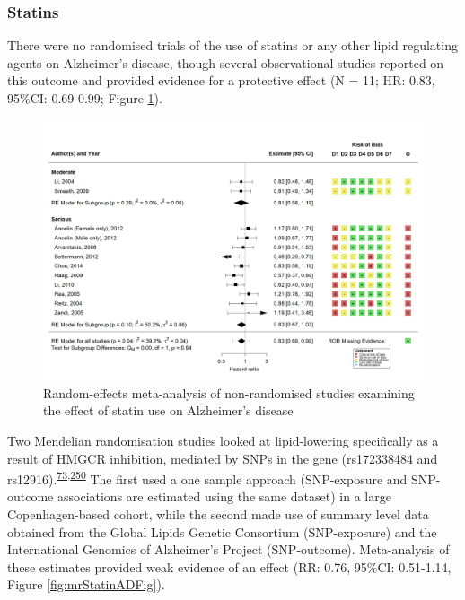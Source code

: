 \documentclass[a4paper, twoside]{templates/ociamthesis}
\begin{document}
\hypertarget{statins-1}{%
\subsubsection{Statins}\label{statins-1}}

There were no randomised trials of the use of statins or any other lipid regulating agents on Alzheimer's disease, though several observational studies reported on this outcome and provided evidence for a protective effect (N = 11; HR: 0.83, 95\%CI: 0.69-0.99; Figure \ref{fig:obsStatinADFig}).





\begin{figure}[H]
\includegraphics[width=1\linewidth]{figures/sys-rev/fp_obs_Statin-Ever_AD} \caption[Random-effects meta-analysis of statins on Alzheimer's disease]{Random-effects meta-analysis of non-randomised studies examining the effect of statin use on Alzheimer's disease}\label{fig:obsStatinADFig}
\end{figure}

Two Mendelian randomisation studies looked at lipid-lowering specifically as a result of HMGCR inhibition, mediated by SNPs in the gene (rs172338484 and rs12916).\textsuperscript{\protect\hyperlink{ref-benn2017}{73},\protect\hyperlink{ref-so2017}{250}} The first used a one sample approach (SNP-exposure and SNP-outcome associations are estimated using the same dataset) in a large Copenhagen-based cohort, while the second made use of summary level data obtained from the Global Lipids Genetic Consortium (SNP-exposure) and the International Genomics of Alzheimer's Project (SNP-outcome). Meta-analysis of these estimates provided weak evidence of an effect (RR: 0.76, 95\%CI: 0.51-1.14, Figure \ref{fig:mrStatinADFig}).
\end{document}
